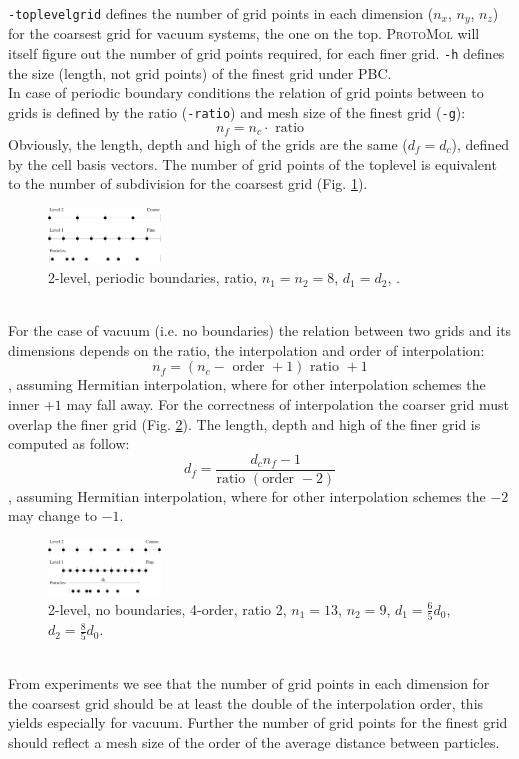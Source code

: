 \documentclass[11pt]{article}
\newcommand{\ProtoMol}{\textsc{ProtoMol }}
\begin{document}
\texttt{-toplevelgrid} defines the number of grid points in each
dimension ($n_x$, $n_y$, $n_z$)  for the coarsest grid for vacuum systems, the one on the
top. \ProtoMol will
itself figure out the number of grid points required, for each finer
grid. \texttt{-h} defines the size (length, not grid points) of the finest
grid under PBC.\\
In case of periodic boundary conditions the relation of grid
points between to grids is defined by the ratio (\texttt{-ratio}) and
mesh size of the finest grid (\texttt{-g}):
\begin{equation}
  n_f = n_c \cdot \mbox{ ratio}
\end{equation}
Obviously, the length, depth and high of the grids are the same ($ d_f
= d_c$), defined by the cell basis vectors. The
number of grid points of the toplevel is equivalent to the number of
subdivision for the coarsest grid (Fig. \ref{fig:levels_bpc}).
\begin{figure}[hbt]
  \centerline{\includegraphics[width=3cm]{levels_pbc.pdf}}
  \caption{2-level, periodic boundaries, ratio, $n_1 = n_2 = 8$, $d_1 = d_2$, .}
  \label{fig:levels_bpc}
\end{figure}
\\
For the case of vacuum (i.e. no boundaries) the relation between two grids
and its dimensions depends on the ratio, the interpolation and order of interpolation:
\begin{equation}
  n_f = (n_c - \mbox{ order }+1) \mbox{ ratio } +1
\end{equation}
, assuming Hermitian interpolation, where for other interpolation
schemes the inner $+1$ may fall away. For the correctness of
interpolation the coarser grid must overlap the finer grid (Fig. \ref{fig:levels_nbc}). 
The length, depth and high of the finer grid is computed as follow:
\begin{equation}
  d_f = \frac{d_c n_f-1}{\mbox{ratio }(\mbox{order }-2)}
\end{equation}
, assuming Hermitian interpolation, where for other interpolation
schemes the $-2$ may change to $-1$.
\begin{figure}[hbt]
  \centerline{\includegraphics[width=3cm]{levels_nbc.pdf}}
  \caption{2-level, no boundaries, 4-order, ratio 2, $n_1 = 13$,
  $n_2 = 9$, $d_1 = \frac{6}{5}d_0$, $d_2 = \frac{8}{5}d_0$.}
  \label{fig:levels_nbc}
\end{figure}
\\
From experiments we see that the number of grid points in each
dimension for the coarsest grid  should be at least the double of the interpolation order,
this yields especially for vacuum. Further the
number of grid points for the finest grid should reflect a mesh size
of the order of the average distance between particles.
\end{document}
